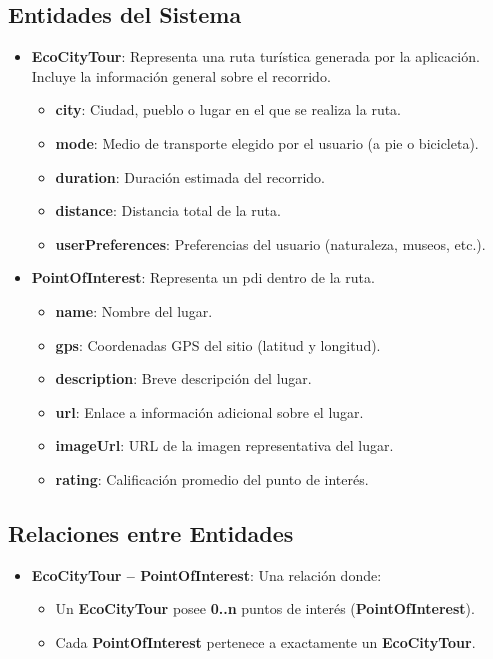 \subsection{Entidades del Sistema}
\begin{itemize}
	\item \textbf{EcoCityTour}: Representa una ruta turística generada por la aplicación. Incluye la información general sobre el recorrido.
	\begin{itemize}
		\item \textbf{city}: Ciudad, pueblo o lugar en el que se realiza la ruta.
		\item \textbf{mode}: Medio de transporte elegido por el usuario (a pie o bicicleta).
		\item \textbf{duration}: Duración estimada del recorrido.
		\item \textbf{distance}: Distancia total de la ruta.
		\item \textbf{userPreferences}: Preferencias del usuario (naturaleza, museos, etc.).
	\end{itemize}
	
	\item {\textbf{PointOfInterest}}: Representa un \acrlong{pdi} dentro de la ruta.
	\begin{itemize}
		\item \textbf{name}: Nombre del lugar.
		\item \textbf{gps}: Coordenadas GPS del sitio (latitud y longitud).
		\item \textbf{description}: Breve descripción del lugar.
		\item \textbf{url}: Enlace a información adicional sobre el lugar.
		\item \textbf{imageUrl}: URL de la imagen representativa del lugar.
		\item \textbf{rating}: Calificación promedio del punto de interés.
	\end{itemize}
\end{itemize}

\subsection{Relaciones entre Entidades}
\begin{itemize}
	\item \textbf{EcoCityTour -- PointOfInterest}: Una relación  donde:
	\begin{itemize}
		\item Un \textbf{EcoCityTour} posee \textbf{0..n} puntos de interés (\textbf{PointOfInterest}).
		\item Cada \textbf{PointOfInterest} pertenece a exactamente un \textbf{EcoCityTour}.
	\end{itemize}
\end{itemize}

